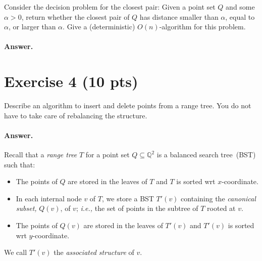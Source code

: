 \documentclass[a4paper]{article}
\newcommand{\QQ}{\mathbb{Q}}
\newcommand{\ie}{\emph{i.e.,} }
\begin{document}
Consider the decision problem for the closest pair:
Given a point set $Q$ and some $\alpha > 0$, return whether the closest pair of $Q$ has distance smaller than $\alpha$, equal to $\alpha$, or larger than $\alpha$.
Give a (deterministic) $O(n)$-algorithm for this problem.

\paragraph{Answer.}


\section*{Exercise 4 (10 pts)}

Describe an algorithm to insert and delete points from a range tree.
You do not have to take care of rebalancing the structure.

\paragraph{Answer.}

Recall that a \emph{range tree} $T$ for a point set $Q \subseteq \QQ^2$ is a balanced search tree~(BST) such that:
\begin{itemize}
	\item The points of $Q$ are stored in the leaves of $T$ and $T$ is sorted wrt $x$-coordinate.
	
	\item In each internal node $v$ of $T$, we store a BST $T'(v)$ containing the \emph{canonical subset,} $Q(v)$, of $v$; \ie the set of points in the subtree of $T$ rooted at $v$.
	
	\item The points of $Q(v)$ are stored in the leaves of $T'(v)$ and $T'(v)$ is sorted wrt $y$-coordinate.
	
\end{itemize}
We call $T'(v)$ the \emph{associated structure} of $v$.

\newcommand{\AEMP}{\mathsf{AEmp}}%
\newcommand{\AINT}{\mathsf{AInt}}%
\newcommand{\ALEAF}{\mathsf{ALeaf}}%
\newcommand{\Akey}{\text{Akey}}%
\newcommand{\Ainsert}{\text{Ainsert}}%
\newcommand{\Adelete}{\text{Adelete}}%
\newcommand{\Arepair}{\text{Arepair}}%
\newcommand{\IF}{\mathrel{\text{if}}}%
\newcommand{\AND}{\mathrel{\text{and}}}%
\newcommand{\WHERE}{\mathrel{\text{where}}}%
\end{document}
